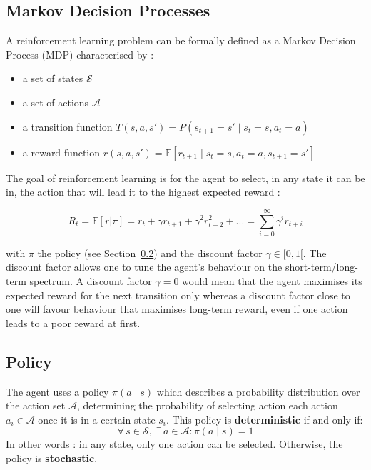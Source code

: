 \subsection{Markov Decision Processes}
A reinforcement learning problem can be formally defined as a Markov 
Decision Process (MDP)  characterised by :
\begin{itemize}
	\item a set of states $\mathcal{S}$
	\item a set of actions $\mathcal{A}$
	\item a transition function 
		$T(s, a, s') = P(s_{t+1} = s' \mid s_t = s, a_t = a)$
	\item a reward function 
		$r(s, a, s') = \mathbb{E}
		 [r_{t+1} \mid s_t = s, a_t = a, s_{t+1} = s']$
\end{itemize}

The goal of reinforcement learning is for the agent to select, in any state it
can be in, the action that will lead it to the highest expected reward :

\begin{equation}
\label{eq:discounted_reward}
R_t = \mathbb{E}[r|\pi] = r_t + \gamma r_{t+1} + \gamma^2 r_{t+2}^2 + ... =
 \sum\limits_{i=0}^\infty \gamma^i r_{t+i}
\end{equation}

\noindent with $\pi$ the policy (see Section~\ref{sec:policy}) and 
the discount factor  $\gamma \in [0, 1[$.
The discount factor allows one to tune the agent's behaviour on the
short-term/long-term spectrum. A discount factor $\gamma=0$ would mean that the
agent maximises its expected reward for the next transition only whereas a
discount factor close to one will favour behaviour that maximises long-term
reward, even if one action leads to a poor reward at first.\\

\subsection{Policy}
\label{sec:policy}
The agent uses a policy $\pi(a \mid s)$ which describes a probability
distribution over the action set $\mathcal{A}$, determining the probability of
selecting action each action $a_i \in \mathcal{A}$ once it is
in a certain state $s_i$. This policy is \textbf{deterministic} if and only if:
\begin{equation}
\forall\, s \in \mathcal{S},\; \exists\, a \in \mathcal{A} : \pi(a \mid s) = 1
\end{equation}
\noindent In other words : in any state, only one action can be selected.
Otherwise, the policy is \textbf{stochastic}.


